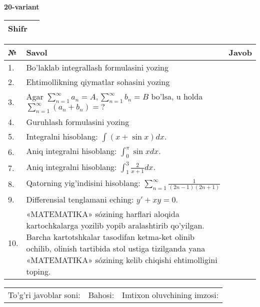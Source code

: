 \documentclass{article}
\begin{document}
  \egroup
  
  \newpage
  
  
  \textbf{20-variant}\\
  
  \bgroup
  \def\arraystretch{1.6} %
  
  \begin{tabular}{|m{5.7cm}|m{9.5cm}|}
  \hline
  Shifr & \\
  \hline
  \end{tabular}
  
  \vspace{1cm}
  
  \begin{tabular}{|m{0.7cm}|m{10cm}|m{4cm}|}
  \hline
  № & Savol & Javob \\
  \hline
  1. & Bo'laklab integrallash formulasini yozing &  \\
  \hline
  2. & Ehtimollikning qiymatlar sohasini yozing &  \\
  \hline
  3. & Agar \(\sum_{n = 1}^{\infty}a_{n} = A,\sum_{n = 1}^{\infty}b_{n} = B\) bo'lsa, u holda \(\sum_{n = 1}^{\infty}\left( a_{n} + b_{n} \right) = ?\) &  \\
  \hline
  4. & Guruhlash formulasini yozing &  \\
  \hline
  5. & Integralni hisoblang: \(\int {(x + \sin x)dx}\). &  \\
  \hline
  6. & Aniq integralni hisoblang: \(\int_{0}^{\pi}{\sin xdx}\). &  \\
  \hline
  7. & Aniq integralni hisoblang: \(\int_{1}^{3}\frac{2}{x + 1}dx\). &  \\
  \hline
  8. & Qatorning yig'indisini hisoblang: \(\sum_{n = 1}^{\infty}\frac{1}{(2n - 1)(2n + 1)}\) &  \\
  \hline
  9. & Differensial tenglamani eching: \(y' + xy = 0\). &  \\
  \hline
  10. & «MATEMATIKA» sózining harflari aloqida kartochkalarga yozilib yopib aralashtirib qo'yilgan. Barcha kartotshkalar tasodifan ketma-ket olinib ochilib, olinish tartibida stol ustiga tizilganda yana «MATEMATIKA» sózining kelib chiqishi ehtimolligini toping. &  \\
  \hline
  \end{tabular}
  
  \vspace{1cm}
  
  \begin{tabular}{lll}
  To'g'ri javoblar soni: \underline{\hspace{1.5cm}} & 
  Bahosi: \underline{\hspace{1.5cm}} & 
  Imtixon oluvchining imzosi: \underline{\hspace{2cm}} \\
  \end{tabular}
  
\end{document}
